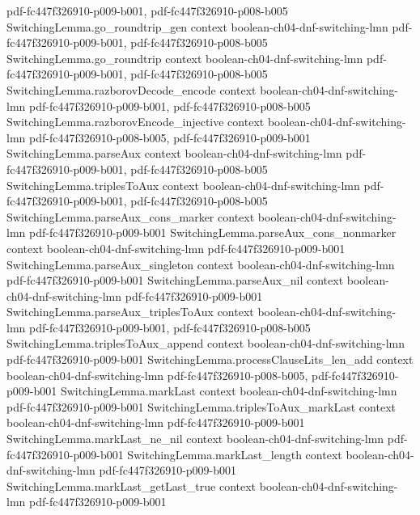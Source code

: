 \begin{theorem}
  {pdf-fc447f326910-p009-b001,
    pdf-fc447f326910-p008-b005}
\proofstep
  {SwitchingLemma.go_roundtrip_gen}
  {context}
  {boolean-ch04-dnf-switching-lmn}
  {pdf-fc447f326910-p009-b001,
    pdf-fc447f326910-p008-b005}
\proofstep
  {SwitchingLemma.go_roundtrip}
  {context}
  {boolean-ch04-dnf-switching-lmn}
  {pdf-fc447f326910-p009-b001,
    pdf-fc447f326910-p008-b005}
\proofstep
  {SwitchingLemma.razborovDecode_encode}
  {context}
  {boolean-ch04-dnf-switching-lmn}
  {pdf-fc447f326910-p009-b001,
    pdf-fc447f326910-p008-b005}
\proofstep
  {SwitchingLemma.razborovEncode_injective}
  {context}
  {boolean-ch04-dnf-switching-lmn}
  {pdf-fc447f326910-p008-b005,
    pdf-fc447f326910-p009-b001}
\proofstep
  {SwitchingLemma.parseAux}
  {context}
  {boolean-ch04-dnf-switching-lmn}
  {pdf-fc447f326910-p009-b001,
    pdf-fc447f326910-p008-b005}
\proofstep
  {SwitchingLemma.triplesToAux}
  {context}
  {boolean-ch04-dnf-switching-lmn}
  {pdf-fc447f326910-p009-b001,
    pdf-fc447f326910-p008-b005}
\proofstep
  {SwitchingLemma.parseAux_cons_marker}
  {context}
  {boolean-ch04-dnf-switching-lmn}
  {pdf-fc447f326910-p009-b001}
\proofstep
  {SwitchingLemma.parseAux_cons_nonmarker}
  {context}
  {boolean-ch04-dnf-switching-lmn}
  {pdf-fc447f326910-p009-b001}
\proofstep
  {SwitchingLemma.parseAux_singleton}
  {context}
  {boolean-ch04-dnf-switching-lmn}
  {pdf-fc447f326910-p009-b001}
\proofstep
  {SwitchingLemma.parseAux_nil}
  {context}
  {boolean-ch04-dnf-switching-lmn}
  {pdf-fc447f326910-p009-b001}
\proofstep
  {SwitchingLemma.parseAux_triplesToAux}
  {context}
  {boolean-ch04-dnf-switching-lmn}
  {pdf-fc447f326910-p009-b001,
    pdf-fc447f326910-p008-b005}
\proofstep
  {SwitchingLemma.triplesToAux_append}
  {context}
  {boolean-ch04-dnf-switching-lmn}
  {pdf-fc447f326910-p009-b001}
\proofstep
  {SwitchingLemma.processClauseLits_len_add}
  {context}
  {boolean-ch04-dnf-switching-lmn}
  {pdf-fc447f326910-p008-b005,
    pdf-fc447f326910-p009-b001}
\proofstep
  {SwitchingLemma.markLast}
  {context}
  {boolean-ch04-dnf-switching-lmn}
  {pdf-fc447f326910-p009-b001}
\proofstep
  {SwitchingLemma.triplesToAux_markLast}
  {context}
  {boolean-ch04-dnf-switching-lmn}
  {pdf-fc447f326910-p009-b001}
\proofstep
  {SwitchingLemma.markLast_ne_nil}
  {context}
  {boolean-ch04-dnf-switching-lmn}
  {pdf-fc447f326910-p009-b001}
\proofstep
  {SwitchingLemma.markLast_length}
  {context}
  {boolean-ch04-dnf-switching-lmn}
  {pdf-fc447f326910-p009-b001}
\proofstep
  {SwitchingLemma.markLast_getLast_true}
  {context}
  {boolean-ch04-dnf-switching-lmn}
  {pdf-fc447f326910-p009-b001}
\proofstep

\end{theorem}
